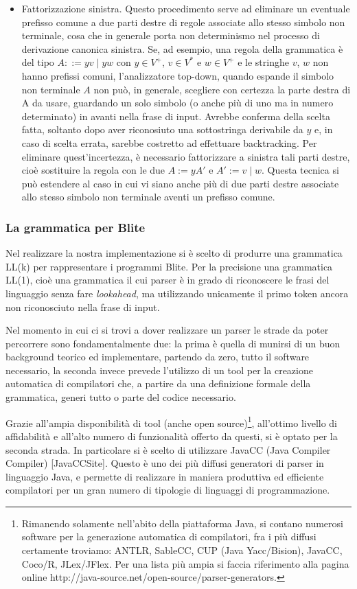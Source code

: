 \begin{itemize}
  \item Fattorizzazione sinistra. Questo procedimento serve ad eliminare un
  eventuale prefisso comune a due parti destre di regole associate allo stesso
  simbolo non terminale, cosa che in generale porta non determinismo nel
  processo di derivazione canonica sinistra. Se, ad esempio, una regola della grammatica
  è del tipo $A ::= yv \;|\; yw$ con $y \in V^+$, $v
  \in V^*$ e $w \in V^+$ e le stringhe $v$, $w$ non hanno prefissi comuni,
  l'analizzatore top-down, quando espande il simbolo non terminale $A$ non può,
  in generale, scegliere con certezza la parte destra di A da usare,
  guardando un solo simbolo (o anche più di uno ma in numero determinato) in
  avanti nella frase di input. Avrebbe conferma della scelta fatta, soltanto
  dopo aver riconosiuto una sottostringa derivabile da $y$ e, in caso di scelta
  errata, sarebbe costretto ad effettuare backtracking. Per eliminare
  quest'incertezza, è necessario fattorizzare a sinistra tali parti destre,
  cioè sostituire la regola con le due $A := yA'$ e $A' := v \; | \; w$.
  Questa tecnica si può estendere al caso in cui vi siano anche più di due
  parti destre associate allo stesso simbolo non terminale aventi un prefisso
  comune.
\end{itemize}

\subsubsection{La grammatica per Blite}

Nel realizzare la nostra implementazione si è scelto di produrre una
grammatica LL(k) per rappresentare i programmi Blite. Per la precisione una grammatica LL(1), cioè
una grammatica il cui parser è in grado di riconoscere le frasi del linguaggio
senza fare \emph{lookahead}, ma utilizzando unicamente il primo token ancora
non riconosciuto nella frase di input.

Nel momento in cui ci si trovi a dover realizzare un parser le strade da poter
percorrere sono fondamentalmente due: la prima è quella di munirsi di un buon
background teorico ed implementare, partendo da zero, tutto il software
necessario, la seconda invece prevede l'utilizzo di un tool per la creazione
automatica di compilatori che, a partire da una definizione formale della
grammatica, generi tutto o parte del codice necessario.

Grazie all'ampia disponibilità di tool (anche open source)\footnote{Rimanendo
solamente nell'abito della piattaforma Java, si contano numerosi software per
la generazione automatica di compilatori, fra i più diffusi certamente troviamo:
ANTLR, SableCC, CUP (Java Yacc/Bision), JavaCC, Coco/R, JLex/JFlex. Per una
lista più ampia si faccia riferimento alla pagina online
http://java-source.net/open-source/parser-generators.}, all'ottimo livello di
affidabilità e all'alto numero di funzionalità offerto da questi, si è optato
per la seconda strada. In particolare si è scelto di utilizzare JavaCC (Java
Compiler Compiler) [JavaCCSite]. Questo è uno dei più diffusi generatori di
parser in linguaggio Java, e permette di realizzare in maniera produttiva ed
efficiente compilatori per un gran numero di tipologie di linguaggi di
programmazione.

